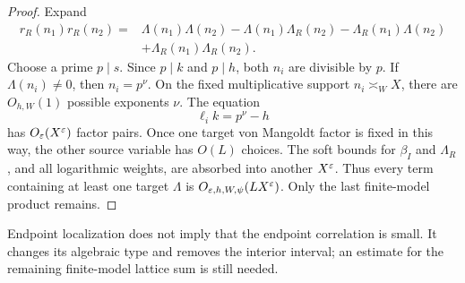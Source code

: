 \begin{proof}
Expand
\begin{align*}
 r_R(n_1)r_R(n_2)
 ={}&\Lambda(n_1)\Lambda(n_2)
 -\Lambda(n_1)\Lambda_R(n_2)
 -\Lambda_R(n_1)\Lambda(n_2)\\
 &+\Lambda_R(n_1)\Lambda_R(n_2).
\end{align*}
Choose a prime $p\mid s$.  Since $p\mid k$ and $p\mid h$, both
$n_i$ are divisible by $p$.  If $\Lambda(n_i)\ne0$, then
$n_i=p^\nu$.  On the fixed multiplicative support $n_i\asymp_WX$,
there are $O_{h,W}(1)$ possible exponents $\nu$.  The equation
\[
 \ell_i k=p^\nu-h
\]
has $O_\varepsilon(X^\varepsilon)$ factor pairs.  Once one target von Mangoldt factor
is fixed in this way, the other source variable has $O(L)$ choices.
The soft bounds for $\beta_I$ and $\Lambda_R$, and all logarithmic
weights, are absorbed into another $X^\varepsilon$.  Thus every term containing
at least one target $\Lambda$ is $O_{\varepsilon,h,W,\psi}(LX^\varepsilon)$.
Only the last finite-model product remains.
\end{proof}

\begin{remark}
Endpoint localization does not imply that the endpoint correlation is
small.  It changes its algebraic type and removes the interior interval;
an estimate for the remaining finite-model lattice sum is still needed.
\end{remark}
